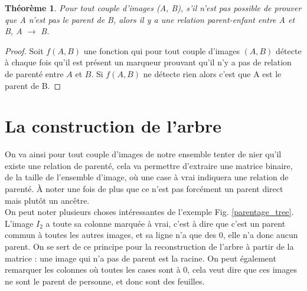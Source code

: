 \documentclass[utf8]{stageM2R} %
\begin{document}

\newtheorem*{parentage}{Théorème}
\begin{parentage}
  Pour tout couple d'images (A, B), s'il n'est pas possible de prouver que A n'est pas le parent de B, alors il y a une relation parent-enfant entre A et B, A $\to$ B.
\end{parentage}

\begin{proof}
  Soit $f(A,B)$ une fonction qui pour tout couple d'images $(A, B)$ détecte à chaque fois qu'il est présent un marqueur prouvant qu'il n'y a pas de relation de parenté entre $A$ et $B$. Si $f(A,B)$ ne détecte rien alors c'est que A est le parent de B.
\end{proof}

\section{La construction de l'arbre}
On va ainsi pour tout couple d'images de notre ensemble tenter de nier qu'il existe une relation de parenté, cela va permettre d'extraire une matrice binaire, de la taille de l'ensemble d'image, où une case à vrai indiquera une relation de parenté. À noter une fois de plus que ce n'est pas forcément un parent direct mais plutôt un ancêtre. \\ \indent
On peut noter plusieurs choses intéressantes de l'exemple Fig. \ref{parentage_tree}. L'image $I_{2}$ a toute sa colonne marquée à vrai, c'est à dire que c'est un parent commun à toutes les autres images, et sa ligne n'a que des 0, elle n'a donc aucun parent. On se sert de ce principe pour la reconstruction de l'arbre à partir de la matrice : une image qui n'a pas de parent est la racine. On peut également remarquer les colonnes où toutes les cases sont à 0, cela veut dire que ces images ne sont le parent de personne, et donc sont des feuilles.
\end{document}
